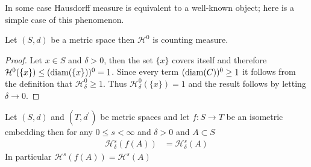 In some case Hausdorff measure is equivalent to a well-known object; here is a simple case of this phenomenon.
\begin{prop}\label{HausdoffMeasureEqualsCounting}Let $(S,d)$ be  a metric space then $\mathcal{H}^0$ is counting measure.
\end{prop}
\begin{proof}
Let $x \in S$ and $\delta>0$, then the set $\lbrace x \rbrace$ covers itself and therefore $\mathcal{H}^0(\lbrace x \rbrace) \leq (\operatorname*{diam}(\lbrace x \rbrace))^0 = 1$.  Since every term
$(\operatorname*{diam}(C))^0 \geq 1$ it follows from the definition that $\mathcal{H}^0_\delta \geq 1$.  Thus $\mathcal{H}^0_\delta(\lbrace x \rbrace) = 1$ and the result follows by letting $\delta \to 0$.
\end{proof}

\begin{prop}\label{HausdorffMeasureUnderIsometry}Let $(S,d)$ and $(T,d^\prime)$ be metric spaces and let $f : S \to T$ be an isometric embedding then for any $0 \leq s < \infty$ and $\delta>0$ and $A \subset S$
\begin{align*}
\mathcal{H}_\delta^s(f(A)) &= \mathcal{H}_\delta^s(A)
\end{align*}
In particular $\mathcal{H}^s(f(A)) = \mathcal{H}^s(A)$
\end{prop}
